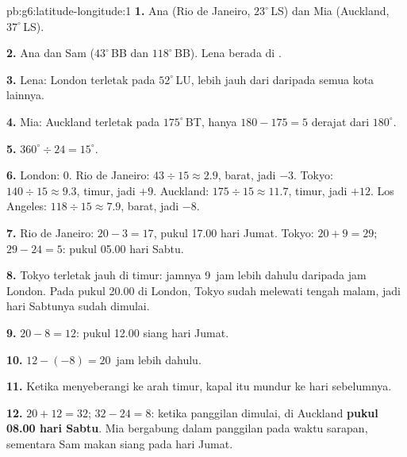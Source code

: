 \begin{solution}{pb:g6:latitude-longitude:1}
\textbf{1.} Ana (Rio de Janeiro, $23^\circ$\,LS) dan Mia (Auckland,
$37^\circ$\,LS).

\textbf{2.} Ana dan Sam ($43^\circ$\,BB dan $118^\circ$\,BB). Lena berada di
.

\textbf{3.} Lena: London terletak pada $52^\circ$\,LU, lebih jauh dari
 daripada semua kota lainnya.

\textbf{4.} Mia: Auckland terletak pada $175^\circ$\,BT, hanya $180 - 175 = 5$
derajat dari  $180^\circ$.

\textbf{5.} $360^\circ \div 24 = 15^\circ$.

\textbf{6.} London: $0$. Rio de Janeiro: $43 \div 15 \approx 2.9$, barat,
jadi $-3$. Tokyo: $140 \div 15 \approx 9.3$, timur, jadi $+9$. Auckland:
$175 \div 15 \approx 11.7$, timur, jadi $+12$. Los Angeles:
$118 \div 15 \approx 7.9$, barat, jadi $-8$.

\textbf{7.} Rio de Janeiro: $20 - 3 = 17$, pukul 17.00 hari Jumat. Tokyo:
$20 + 9 = 29$; $29 - 24 = 5$: pukul 05.00 hari Sabtu.

\textbf{8.} Tokyo terletak jauh di timur: jamnya 9~jam lebih dahulu daripada
jam London. Pada pukul 20.00 di London, Tokyo sudah melewati tengah malam,
jadi hari Sabtunya sudah dimulai.

\textbf{9.} $20 - 8 = 12$: pukul 12.00 siang hari Jumat.

\textbf{10.} $12 - (-8) = 20$~jam lebih dahulu.

\textbf{11.} Ketika menyeberangi  ke arah timur, kapal itu
mundur ke hari sebelumnya.

\textbf{12.} $20 + 12 = 32$; $32 - 24 = 8$: ketika panggilan dimulai, di
Auckland \textbf{pukul 08.00 hari Sabtu}. Mia bergabung dalam panggilan pada
waktu sarapan, sementara Sam makan siang pada hari Jumat.
\end{solution}
